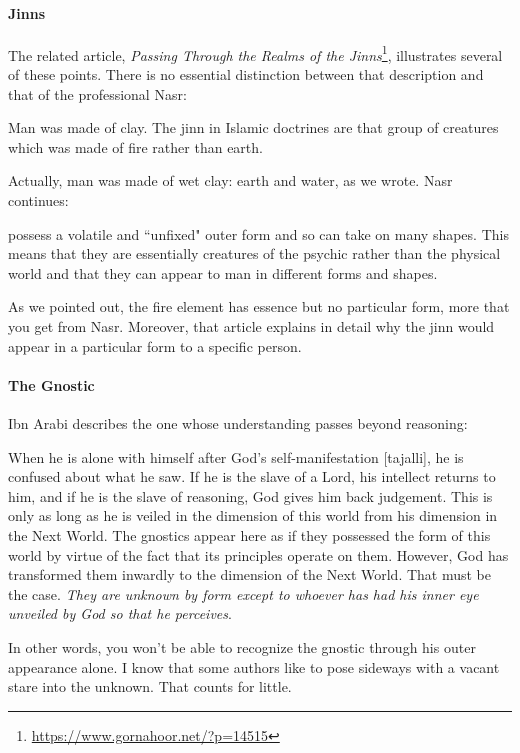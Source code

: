 \paragraph{Jinns}
The related article, \textit{Passing Through the Realms of the Jinns}\footnote{\url{https://www.gornahoor.net/?p=14515}}, illustrates several of these points. There is no essential distinction between that description and that of the professional Nasr:

\begin{quotex}
Man was made of clay. The jinn in Islamic doctrines are that group of creatures which was made of fire rather than earth.

\end{quotex}
Actually, man was made of wet clay: earth and water, as we wrote. Nasr continues:

\begin{quotex}
[Jinns] possess a volatile and ``unfixed" outer form and so can take on many shapes. This means that they are essentially creatures of the psychic rather than the physical world and that they can appear to man in different forms and shapes. 

\end{quotex}
As we pointed out, the fire element has essence but no particular form, more that you get from Nasr. Moreover, that article explains in detail why the jinn would appear in a particular form to a specific person.

\paragraph{The Gnostic}
Ibn Arabi describes the one whose understanding passes beyond reasoning:

\begin{quotex}
When he is alone with himself after God's self-manifestation [tajalli], he is confused about what he saw. If he is the slave of a Lord, his intellect returns to him, and if he is the slave of reasoning, God gives him back judgement. This is only as long as he is veiled in the dimension of this world from his dimension in the Next World. The gnostics appear here as if they possessed the form of this world by virtue of the fact that its principles operate on them. However, God has transformed them inwardly to the dimension of the Next World. That must be the case. \emph{They are unknown by form except to whoever has had his inner eye unveiled by God so that he perceives}. 

\end{quotex}
In other words, you won't be able to recognize the gnostic through his outer appearance alone. I know that some authors like to pose sideways with a vacant stare into the unknown. That counts for little.



